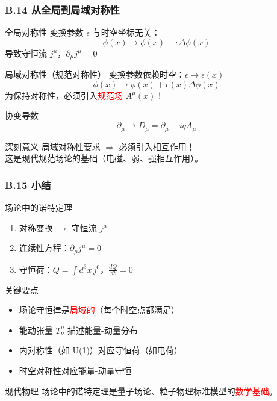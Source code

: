 \documentclass[xcolor=dvipsnames]{ctexbeamer}
\begin{document}
\begin{frame}
\frametitle{B.14 从全局到局域对称性}
\begin{block}{全局对称性}
变换参数 $\epsilon$ 与时空坐标无关：
$$\phi(x) \to \phi(x) + \epsilon \Delta\phi(x)$$
导致守恒流 $j^\mu$，$\partial_\mu j^\mu = 0$
\end{block}

\pause

\begin{block}{局域对称性（规范对称性）}
变换参数依赖时空：$\epsilon \to \epsilon(x)$
$$\phi(x) \to \phi(x) + \epsilon(x)\Delta\phi(x)$$
为保持对称性，必须引入\textcolor{red}{规范场} $A^\mu(x)$！
\end{block}

\pause

\begin{block}{协变导数}
$$\partial_\mu \to D_\mu = \partial_\mu - iqA_\mu$$
\end{block}

\pause

\begin{alertblock}{深刻意义}
局域对称性要求 $\Rightarrow$ 必须引入相互作用！\\
这是现代规范场论的基础（电磁、弱、强相互作用）。
\end{alertblock}
\end{frame}

\begin{frame}
\frametitle{B.15 小结}
\begin{block}{场论中的诺特定理}
\begin{enumerate}
\item 对称变换 $\to$ 守恒流 $j^\mu$
\item 连续性方程：$\partial_\mu j^\mu = 0$
\item 守恒荷：$Q = \int d^3x \, j^0$，$\frac{dQ}{dt} = 0$
\end{enumerate}
\end{block}

\pause

\begin{block}{关键要点}
\begin{itemize}
\item 场论守恒律是\textcolor{red}{局域的}（每个时空点都满足）
\item 能动张量 $T^\mu_\nu$ 描述能量-动量分布
\item 内对称性（如 U(1)）对应守恒荷（如电荷）
\item 时空对称性对应能量-动量守恒
\end{itemize}
\end{block}

\pause

\begin{alertblock}{现代物理}
场论中的诺特定理是量子场论、粒子物理标准模型的\textcolor{red}{数学基础}。
\end{alertblock}
\end{frame}
\end{document}
